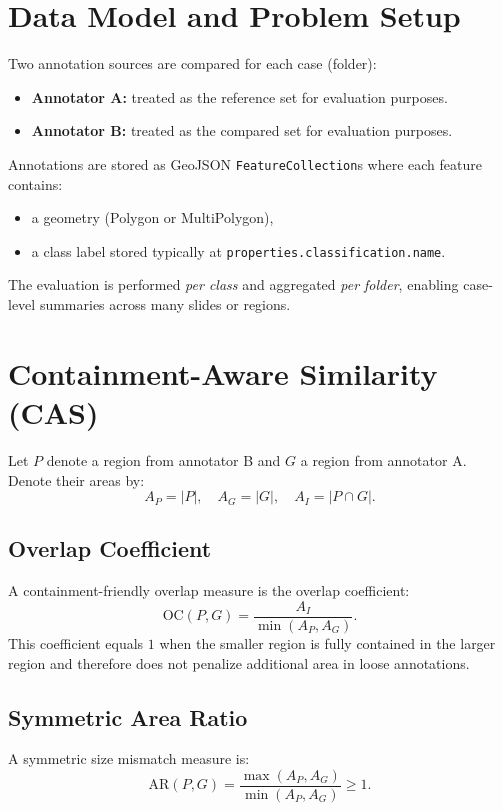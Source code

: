 \documentclass[11pt]{article}
\begin{document}
\section{Data Model and Problem Setup}
Two annotation sources are compared for each case (folder):
\begin{itemize}[leftmargin=*]
  \item \textbf{Annotator A:} treated as the reference set for evaluation purposes.
  \item \textbf{Annotator B:} treated as the compared set for evaluation purposes.
\end{itemize}

Annotations are stored as GeoJSON \texttt{FeatureCollection}s where each feature contains:
\begin{itemize}[leftmargin=*]
  \item a geometry (Polygon or MultiPolygon),
  \item a class label stored typically at \texttt{properties.classification.name}.
\end{itemize}

The evaluation is performed \emph{per class} and aggregated \emph{per folder}, enabling case-level summaries across many slides or regions.

\section{Containment-Aware Similarity (CAS)}
Let $P$ denote a region from annotator B and $G$ a region from annotator A.
Denote their areas by:
\[
A_P = |P|,\quad A_G = |G|,\quad A_I = |P \cap G|.
\]

\subsection{Overlap Coefficient}
A containment-friendly overlap measure is the overlap coefficient:
\begin{equation}
\mathrm{OC}(P,G) = \frac{A_I}{\min(A_P, A_G)}.
\end{equation}
This coefficient equals $1$ when the smaller region is fully contained in the larger region and therefore does not penalize additional area in loose annotations.

\subsection{Symmetric Area Ratio}
A symmetric size mismatch measure is:
\begin{equation}
\mathrm{AR}(P,G) = \frac{\max(A_P, A_G)}{\min(A_P, A_G)} \ge 1.
\end{equation}
\end{document}
